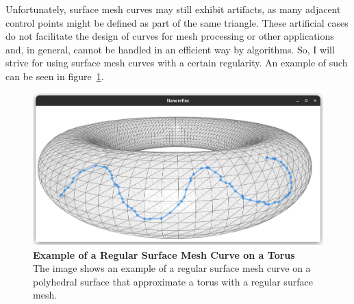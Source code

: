 \documentclass{stdlocal}
\begin{document}

  Unfortunately, surface mesh curves may still exhibit artifacts, as many adjacent control points might be defined as part of the same triangle.
  These artificial cases do not facilitate the design of curves for mesh processing or other applications and, in general, cannot be handled in an efficient way by algorithms.
  So, I will strive for using surface mesh curves with a certain regularity.
  An example of such can be seen in figure~\ref{fig:surface-mesh-curve-example}.

  \begin{figure}
    \centering
    \includegraphics[width=0.8\linewidth,trim={15px 20 25 50},clip]{images/surface-mesh-curve-torus.png}
    \caption[Example of a Regular Surface Mesh Curve on a Torus]{%
      \textbf{Example of a Regular Surface Mesh Curve on a Torus}\\
      The image shows an example of a regular surface mesh curve on a polyhedral surface that approximate a torus with a regular surface mesh.
    }
    \label{fig:surface-mesh-curve-example}
  \end{figure}
\end{document}
